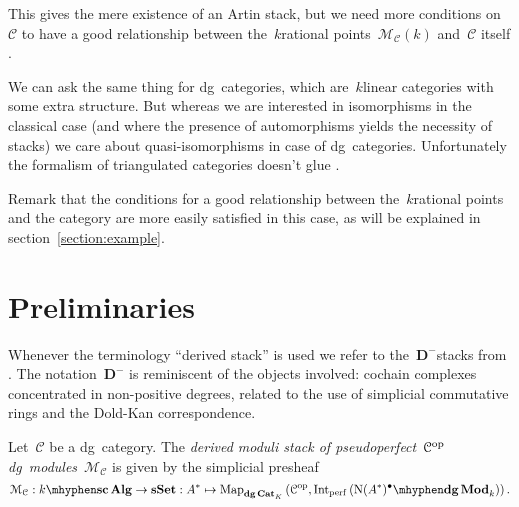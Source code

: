 \begin{refsection}
\begin{example}
  This gives the mere existence of an Artin stack, but we need more conditions on~$\mathcal{C}$ to have a good relationship between the~$k$\dash rational points~$\mathcal{M}_{\mathcal{C}}(k)$ and~$\mathcal{C}$ itself \cite[remark 1.2]{toen-vaquie}.
\end{example}

\begin{remark}
  We can ask the same thing for dg~categories, which are~$k$\dash linear categories with some extra structure. But whereas we are interested in isomorphisms in the classical case (and where the presence of automorphisms yields the necessity of stacks) we care about quasi-isomorphisms in case of dg~categories. Unfortunately the formalism of triangulated categories doesn't glue \cite{lnm2008}.
  
  Remark that the conditions for a good relationship between the~$k$\dash rational points and the category are more easily satisfied in this case, as will be explained in section~\ref{section:example}.
\end{remark}

\begin{example}
  
\end{example}

\section{Preliminaries}
\label{section:preliminaries}
Whenever the terminology ``derived stack'' is used we refer to the~$\mathbf{D}^-$\dash stacks from \cite{hagII}. The notation~$\mathbf{D}^-$ is reminiscent of the objects involved: cochain complexes concentrated in non-positive degrees, related to the use of simplicial commutative rings and the Dold-Kan correspondence.

\begin{definition}
  Let~$\mathcal{C}$ be a dg~category. The \emph{derived moduli stack of pseudoperfect~$\mathcal{C}^{\mathrm{op}}$\dash dg~modules}~$\mathcal{M}_{\mathcal{C}}$ is given by the simplicial presheaf
  \begin{equation}
    \mathcal{M}_{\mathcal{C}}:\scAlg{k}\to\sSet:A^*\mapsto\Map_{\dgCat_K}\left( \mathcal{C}^\opp,\Int_\perf\left( \dgMod{\nerve(A^*)^\bullet}_k \right) \right).
  \end{equation}
\end{definition}


\end{refsection}
